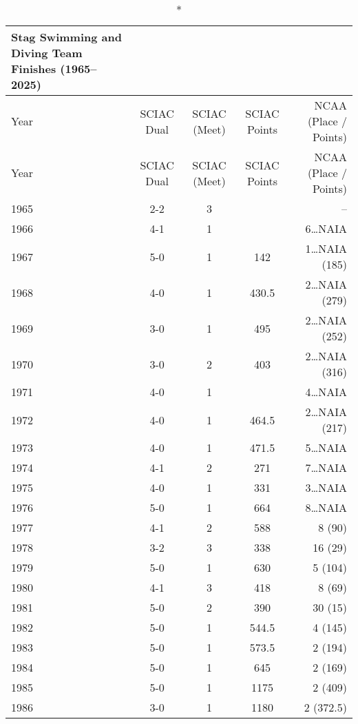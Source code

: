     \clearpage
    \begin{longtable}{lcccr}
        \caption*{Stag Swimming and Diving Team Finishes (1965–2025)} \\
        \toprule
        Year & SCIAC Dual & SCIAC (Meet) & SCIAC Points & NCAA (Place / Points) \\
        \midrule
        \endfirsthead
    
        \toprule
        Year & SCIAC Dual & SCIAC (Meet) & SCIAC Points & NCAA (Place / Points) \\
        \midrule
        \endhead

        \bottomrule
        \endfoot
    

        1965 & 2-2 & 3 &   & -- \\
        1966 & 4-1 & 1 &   & 6\ldots NAIA \\
        1967 & 5-0 & 1 & 142 & 1\ldots NAIA (185) \\
        1968 & 4-0 & 1 & 430.5 & 2\ldots NAIA (279) \\
        1969 & 3-0 & 1 & 495 & 2\ldots NAIA (252) \\
        1970 & 3-0 & 2 & 403 & 2\ldots NAIA (316) \\
        1971 & 4-0 & 1 &   & 4\ldots NAIA \\
        1972 & 4-0 & 1 & 464.5 & 2\ldots NAIA (217) \\
        1973 & 4-0 & 1 & 471.5 & 5\ldots NAIA \\
        1974 & 4-1 & 2 & 271 & 7\ldots NAIA \\
        1975 & 4-0 & 1 & 331 & 3\ldots NAIA \\
        1976 & 5-0 & 1 & 664 & 8\ldots NAIA \\
        1977 & 4-1 & 2 & 588 & 8 (90) \\
        1978 & 3-2 & 3 & 338 & 16 (29) \\
        1979 & 5-0 & 1 & 630 & 5 (104) \\
        1980 & 4-1 & 3 & 418 & 8 (69) \\
        1981 & 5-0 & 2 & 390 & 30 (15) \\
        1982 & 5-0 & 1 & 544.5 & 4 (145) \\
        1983 & 5-0 & 1 & 573.5 & 2 (194) \\
        1984 & 5-0 & 1 & 645 & 2 (169) \\
        1985 & 5-0 & 1 & 1175 & 2 (409) \\
        1986 & 3-0 & 1 & 1180 & 2 (372.5) \\

\end{longtable}
